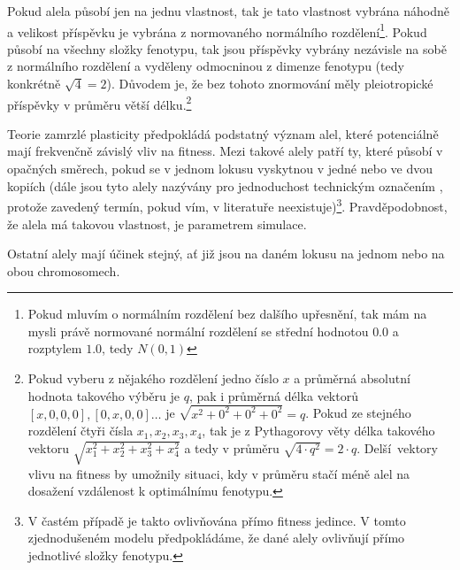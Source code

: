 Pokud alela působí jen na jednu vlastnost, tak je tato vlastnost vybrána náhodně a velikost příspěvku je vybrána z
normovaného normálního rozdělení\footnote{Pokud mluvím o normálním rozdělení bez dalšího upřesnění, tak mám na mysli
právě normované normální rozdělení se střední hodnotou $0.0$ a rozptylem $1.0$, tedy $N(0, 1)$}.
Pokud působí na všechny složky fenotypu, tak jsou příspěvky vybrány nezávisle na sobě z normálního
rozdělení a vyděleny odmocninou z dimenze fenotypu (tedy konkrétně $\sqrt{4} = 2$).
Důvodem je, že bez tohoto znormování měly pleiotropické příspěvky v průměru větší délku.\footnote{
    Pokud vyberu z nějakého rozdělení jedno číslo $x$ a průměrná absolutní hodnota takového výběru je $q$, pak i
    průměrná délka vektorů $[x, 0, 0, 0], [0, x, 0, 0]\ldots$ je $\sqrt{x^2 + 0^2+ 0^2+ 0^2} = q$.
    Pokud ze stejného rozdělení čtyři čísla $x_1, x_2, x_3, x_4$, tak je z Pythagorovy věty délka takového vektoru
    $\sqrt{x_1^2 + x_2^2+ x_3^2+ x_4^2}$ a tedy v průměru $\sqrt{4 \cdot q^2} = 2 \cdot q$. Delší vektory vlivu na
    fitness by umožnily situaci, kdy v průměru stačí méně alel na dosažení vzdálenost k optimálnímu fenotypu.
}

Teorie zamrzlé plasticity předpokládá podstatný význam alel, které potenciálně mají frekvenčně závislý vliv na fitness.
Mezi takové alely patří ty, které působí v opačných směrech, pokud se
v jednom lokusu vyskytnou v jedné nebo ve dvou kopiích (dále jsou tyto alely nazývány pro jednoduchost
technickým označením , protože zavedený termín, pokud vím, v literatuře neexistuje)\footnote{
V častém případě je takto ovlivňována přímo fitness jedince. V tomto zjednodušeném modelu předpokládáme, že dané alely
ovlivňují přímo jednotlivé složky fenotypu.
}. Pravděpodobnost, že alela má takovou vlastnost, je parametrem simulace.

Ostatní alely mají účinek stejný, ať již jsou na daném lokusu na jednom nebo na obou chromosomech.

\vspace{1em}

